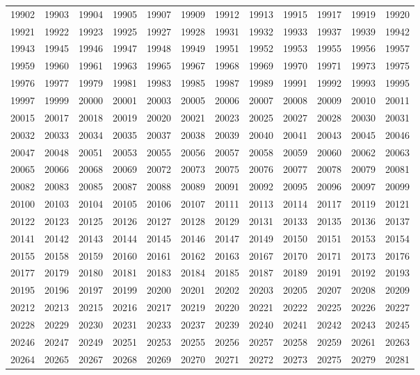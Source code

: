 \begin{center}
\begin{longtable}{llllllllllll}
19902 &19903 &19904 &19905 &19907 &19909 &19912 &19913 &19915 &19917 &19919 &19920 \\
19921 &19922 &19923 &19925 &19927 &19928 &19931 &19932 &19933 &19937 &19939 &19942 \\
19943 &19945 &19946 &19947 &19948 &19949 &19951 &19952 &19953 &19955 &19956 &19957 \\
19959 &19960 &19961 &19963 &19965 &19967 &19968 &19969 &19970 &19971 &19973 &19975 \\
19976 &19977 &19979 &19981 &19983 &19985 &19987 &19989 &19991 &19992 &19993 &19995 \\
19997 &19999 &20000 &20001 &20003 &20005 &20006 &20007 &20008 &20009 &20010 &20011 \\
20015 &20017 &20018 &20019 &20020 &20021 &20023 &20025 &20027 &20028 &20030 &20031 \\
20032 &20033 &20034 &20035 &20037 &20038 &20039 &20040 &20041 &20043 &20045 &20046 \\
20047 &20048 &20051 &20053 &20055 &20056 &20057 &20058 &20059 &20060 &20062 &20063 \\
20065 &20066 &20068 &20069 &20072 &20073 &20075 &20076 &20077 &20078 &20079 &20081 \\
20082 &20083 &20085 &20087 &20088 &20089 &20091 &20092 &20095 &20096 &20097 &20099 \\
20100 &20103 &20104 &20105 &20106 &20107 &20111 &20113 &20114 &20117 &20119 &20121 \\
20122 &20123 &20125 &20126 &20127 &20128 &20129 &20131 &20133 &20135 &20136 &20137 \\
20141 &20142 &20143 &20144 &20145 &20146 &20147 &20149 &20150 &20151 &20153 &20154 \\
20155 &20158 &20159 &20160 &20161 &20162 &20163 &20167 &20170 &20171 &20173 &20176 \\
20177 &20179 &20180 &20181 &20183 &20184 &20185 &20187 &20189 &20191 &20192 &20193 \\
20195 &20196 &20197 &20199 &20200 &20201 &20202 &20203 &20205 &20207 &20208 &20209 \\
20212 &20213 &20215 &20216 &20217 &20219 &20220 &20221 &20222 &20225 &20226 &20227 \\
20228 &20229 &20230 &20231 &20233 &20237 &20239 &20240 &20241 &20242 &20243 &20245 \\
20246 &20247 &20249 &20251 &20253 &20255 &20256 &20257 &20258 &20259 &20261 &20263 \\
20264 &20265 &20267 &20268 &20269 &20270 &20271 &20272 &20273 &20275 &20279 &20281 \\

\end{longtable}
\end{center}
